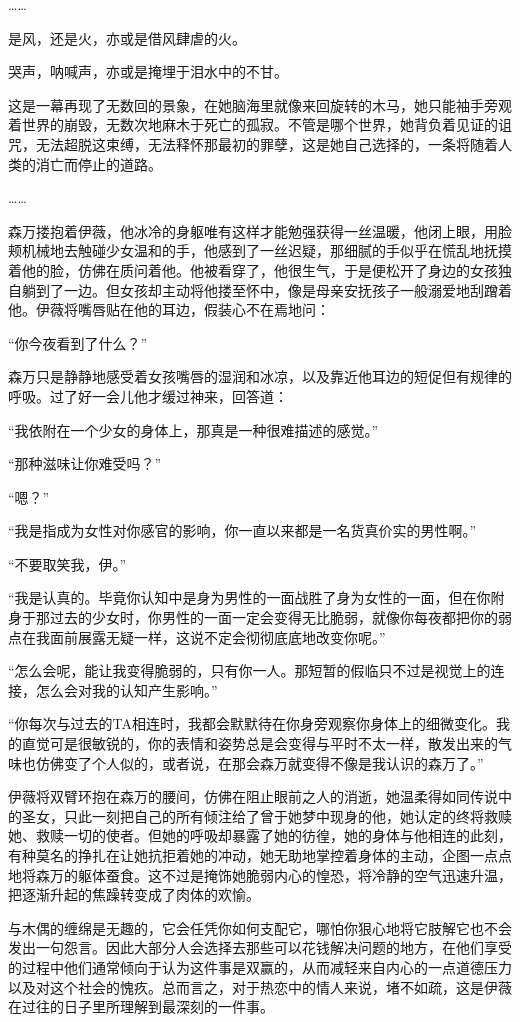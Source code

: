……

是风，还是火，亦或是借风肆虐的火。

哭声，呐喊声，亦或是掩埋于泪水中的不甘。

这是一幕再现了无数回的景象，在她脑海里就像来回旋转的木马，她只能袖手旁观着世界的崩毁，无数次地麻木于死亡的孤寂。不管是哪个世界，她背负着见证的诅咒，无法超脱这束缚，无法释怀那最初的罪孽，这是她自己选择的，一条将随着人类的消亡而停止的道路。

……

森万搂抱着伊薇，他冰冷的身躯唯有这样才能勉强获得一丝温暖，他闭上眼，用脸颊机械地去触碰少女温和的手，他感到了一丝迟疑，那细腻的手似乎在慌乱地抚摸着他的脸，仿佛在质问着他。他被看穿了，他很生气，于是便松开了身边的女孩独自躺到了一边。但女孩却主动将他搂至怀中，像是母亲安抚孩子一般溺爱地刮蹭着他。伊薇将嘴唇贴在他的耳边，假装心不在焉地问：

“你今夜看到了什么？”

森万只是静静地感受着女孩嘴唇的湿润和冰凉，以及靠近他耳边的短促但有规律的呼吸。过了好一会儿他才缓过神来，回答道：

“我依附在一个少女的身体上，那真是一种很难描述的感觉。”

“那种滋味让你难受吗？”

“嗯？”

“我是指成为女性对你感官的影响，你一直以来都是一名货真价实的男性啊。”

“不要取笑我，伊。”

“我是认真的。毕竟你认知中是身为男性的一面战胜了身为女性的一面，但在你附身于那过去的少女时，你男性的一面一定会变得无比脆弱，就像你每夜都把你的弱点在我面前展露无疑一样，这说不定会彻彻底底地改变你呢。”

“怎么会呢，能让我变得脆弱的，只有你一人。那短暂的假临只不过是视觉上的连接，怎么会对我的认知产生影响。”

“你每次与过去的TA相连时，我都会默默待在你身旁观察你身体上的细微变化。我的直觉可是很敏锐的，你的表情和姿势总是会变得与平时不太一样，散发出来的气味也仿佛变了个人似的，或者说，在那会森万就变得不像是我认识的森万了。”

伊薇将双臂环抱在森万的腰间，仿佛在阻止眼前之人的消逝，她温柔得如同传说中的圣女，只此一刻把自己的所有倾注给了曾于她梦中现身的他，她认定的终将救赎她、救赎一切的使者。但她的呼吸却暴露了她的彷徨，她的身体与他相连的此刻，有种莫名的挣扎在让她抗拒着她的冲动，她无助地掌控着身体的主动，企图一点点地将森万的躯体蚕食。这不过是掩饰她脆弱内心的惶恐，将冷静的空气迅速升温，把逐渐升起的焦躁转变成了肉体的欢愉。

与木偶的缠绵是无趣的，它会任凭你如何支配它，哪怕你狠心地将它肢解它也不会发出一句怨言。因此大部分人会选择去那些可以花钱解决问题的地方，在他们享受的过程中他们通常倾向于认为这件事是双赢的，从而减轻来自内心的一点道德压力以及对这个社会的愧疚。总而言之，对于热恋中的情人来说，堵不如疏，这是伊薇在过往的日子里所理解到最深刻的一件事。

